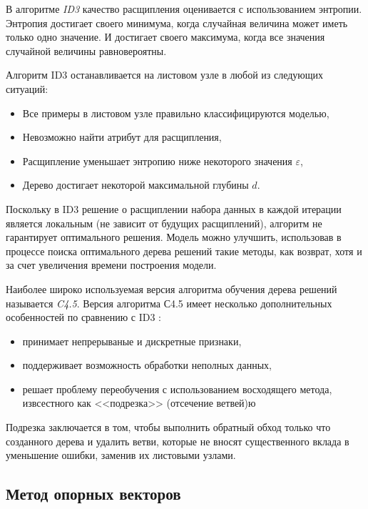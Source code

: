 \documentclass[%
	11pt,
	a4paper,
	utf8,
		]{article}
\begin{document}
В алгоритме \emph{ID3} качество расщипления оценивается с использованием энтропии. Энтропия достигает своего минимума, когда случайная величина может иметь только одно значение. И достигает своего максимума, когда все значения случайной величины равновероятны.

Алгоритм ID3 останавливается на листовом узле в любой из следующих ситуаций:
\begin{itemize}
	\item Все примеры в листовом узле правильно классифицируются моделью,
	
	\item Невозможно найти атрибут для расщипления,
	
	\item Расщипление уменьшает энтропию ниже некоторого значения $ \varepsilon $,
	
	\item Дерево достигает некоторой максимальной глубины $ d $.
\end{itemize}

Поскольку в ID3 решение о расщиплении набора данных в каждой итерации является локальным (не зависит от будущих расщиплений), алгоритм не гарантирует оптимального решения. Модель можно улучшить, использовав в процессе поиска оптимального дерева решений такие методы, как возврат, хотя и за счет увеличения времени построения модели.

Наиболее широко используемая версия алгоритма обучения дерева решений называется \emph{C4.5}. Версия алгоритма С4.5 имеет несколько дополнительных особенностей по сравнению с ID3 \cite[]{burkov:2020}:
\begin{itemize}
	\item принимает непрерываные и дискретные признаки,
	
	\item поддерживает возможность обработки неполных данных,
	
	\item решает проблему переобучения с использованием восходящего метода, извсестного как <<подрезка>> (отсечение ветвей)ю
\end{itemize}

Подрезка заключается в том, чтобы выполнить обратный обход только что созданного дерева и удалить ветви, которые не вносят существенного вклада в уменьшение ошибки, заменив их листовыми узлами.

\subsection{Метод опорных векторов}
\end{document}
